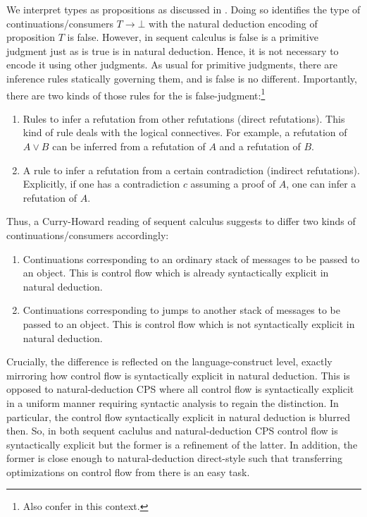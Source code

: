We interpret types as propositions as discussed in \cite{10.1145/2699407}.
Doing so identifies the type of continuations/consumers $T \to \bot$ with the natural deduction encoding of {\glqq}proposition $T$ is false{\grqq}.
However, in sequent calculus {\glqq}is false{\grqq} is a primitive judgment just as {\glqq}is true{\grqq} is in natural deduction.
Hence, it is not necessary to encode it using other judgments.
As usual for primitive judgments, there are inference rules statically governing them, and {\glqq}is false{\grqq} is no different.
Importantly, there are two kinds of those rules for the {\glqq}is false{\grqq}-judgment:\footnote{Also confer \cite{zeilberger2008unity} in this context.}
\begin{enumerate}
  \item
    Rules to infer a refutation from other refutations (direct refutations).
    This kind of rule deals with the logical connectives.
    For example, a refutation of $A \lor B$ can be inferred from a refutation of $A$ and a refutation of $B$.
  \item
    A rule to infer a refutation from a certain contradiction (indirect refutations).
    Explicitly, if one has a contradiction $c$ assuming a proof of $A$, one can infer a refutation of $A$.
\end{enumerate}
Thus, a Curry-Howard reading of sequent calculus suggests to differ two kinds of continuations/consumers accordingly:
\begin{enumerate}
  \item
    Continuations corresponding to an ordinary stack of messages to be passed to an object. This is control flow which is already syntactically explicit in natural deduction.
  \item
    Continuations corresponding to jumps to another stack of messages to be passed to an object. This is control flow which is not syntactically explicit in natural deduction.
\end{enumerate}
Crucially, the difference is reflected on the language-construct level, exactly mirroring how control flow is syntactically explicit in natural deduction.
This is opposed to natural-deduction CPS where all control flow is syntactically explicit in a uniform manner requiring syntactic analysis to regain the distinction.
In particular, the control flow syntactically explicit in natural deduction is blurred then.
So, in both sequent caclulus and natural-deduction CPS control flow is syntactically explicit but the former is a refinement of the latter.
In addition, the former is close enough to natural-deduction direct-style such that transferring optimizations on control flow from there is an easy task.
